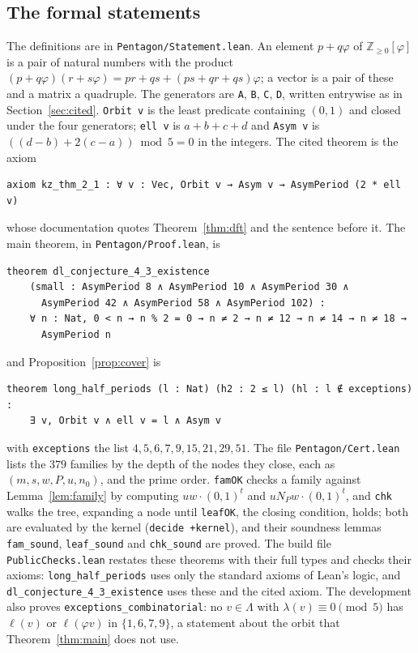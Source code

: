 \documentclass[11pt]{article}
\theoremstyle{definition}
\theoremstyle{remark}
\begin{document}
\begin{appendices}
\section{The formal statements}\label{app:lean}

The definitions are in \texttt{Pentagon/Statement.lean}. An element
$p+q\varphi$ of $\mathbb{Z}_{\ge0}[\varphi]$ is a pair of natural numbers
with the product $(p+q\varphi)(r+s\varphi)=pr+qs+(ps+qr+qs)\varphi$; a
vector is a pair of these and a matrix a quadruple. The generators are
\texttt{A}, \texttt{B}, \texttt{C}, \texttt{D}, written entrywise as in
Section~\ref{sec:cited}. \texttt{Orbit v} is the least predicate
containing $(0,1)$ and closed under the four generators; \texttt{ell v} is
$a+b+c+d$ and \texttt{Asym v} is $((d-b)+2(c-a))\bmod 5=0$ in the
integers. The cited theorem is the axiom
\begin{verbatim}
axiom kz_thm_2_1 : ∀ v : Vec, Orbit v → Asym v → AsymPeriod (2 * ell v)
\end{verbatim}
whose documentation quotes Theorem~\ref{thm:dft} and the sentence before
it. The main theorem, in \texttt{Pentagon/Proof.lean}, is
\begin{verbatim}
theorem dl_conjecture_4_3_existence
    (small : AsymPeriod 8 ∧ AsymPeriod 10 ∧ AsymPeriod 30 ∧
      AsymPeriod 42 ∧ AsymPeriod 58 ∧ AsymPeriod 102) :
    ∀ n : Nat, 0 < n → n % 2 = 0 → n ≠ 2 → n ≠ 12 → n ≠ 14 → n ≠ 18 →
      AsymPeriod n
\end{verbatim}
and Proposition~\ref{prop:cover} is
\begin{verbatim}
theorem long_half_periods (l : Nat) (h2 : 2 ≤ l) (hl : l ∉ exceptions) :
    ∃ v, Orbit v ∧ ell v = l ∧ Asym v
\end{verbatim}
with \texttt{exceptions} the list $4,5,6,7,9,15,21,29,51$. The file
\texttt{Pentagon/Cert.lean} lists the $379$ families by the depth of the
nodes they close, each as $(m,s,w,P,u,n_0)$, and the prime order.
\texttt{famOK} checks a family against Lemma~\ref{lem:family} by computing
$uw\cdot(0,1)^t$ and $uN_Pw\cdot(0,1)^t$, and \texttt{chk} walks the tree,
expanding a node until \texttt{leafOK}, the closing condition, holds; both
are evaluated by the kernel (\texttt{decide +kernel}), and their soundness
lemmas \texttt{fam\_sound}, \texttt{leaf\_sound} and \texttt{chk\_sound} are
proved. The build file \texttt{PublicChecks.lean} restates these theorems with
their full types and checks their axioms: \texttt{long\_half\_periods}
uses only the standard axioms of Lean's logic, and
\texttt{dl\_conjecture\_4\_3\_existence} uses these and the cited axiom. The development also proves
\texttt{exceptions\_combinatorial}: no $v\in\Lambda$ with
$\lambda(v)\equiv0\pmod5$ has $\ell(v)$ or $\ell(\varphi v)$ in
$\{1,6,7,9\}$, a statement about the orbit that Theorem~\ref{thm:main}
does not use.
\end{appendices}
\end{document}
